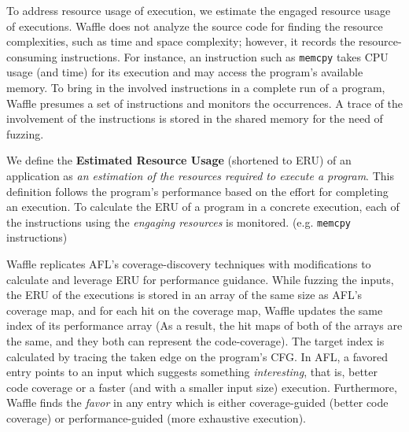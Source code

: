 
To address resource usage of execution, we estimate the engaged resource usage of executions. Waffle does not analyze the source code for finding the resource complexities, such as time and space complexity; however, it records the resource-consuming instructions. For instance, an instruction such as \texttt{memcpy} takes CPU usage (and time) for its execution and may access the program's available memory. To bring in the involved instructions in a complete run of a program, Waffle presumes a set of instructions and monitors the occurrences. A trace of the involvement of the instructions is stored in the shared memory for the need of fuzzing.


We define the \textbf{Estimated Resource Usage} (shortened to ERU) of an application as \textit{an estimation of the resources required to execute a program}. This definition follows the program's performance based on the effort for completing an execution. To calculate the ERU of a program in a concrete execution, each of the instructions using the \textit{engaging resources} is monitored. (e.g. \texttt{memcpy} instructions)  


Waffle replicates AFL's coverage-discovery techniques with modifications to calculate and leverage ERU for performance guidance. While fuzzing the inputs, the ERU of the executions is stored in an array of the same size as AFL's coverage map, and for each hit on the coverage map, Waffle updates the same index of its performance array (As a result, the hit maps of both of the arrays are the same, and they both can represent the code-coverage). The target index is calculated by tracing the taken edge on the program's CFG. In AFL, a favored entry points to an input which suggests something \textit{interesting}, that is, better code coverage or a faster (and with a smaller input size) execution. Furthermore, Waffle finds the \textit{favor} in any entry which is either coverage-guided (better code coverage) or performance-guided (more exhaustive execution).

